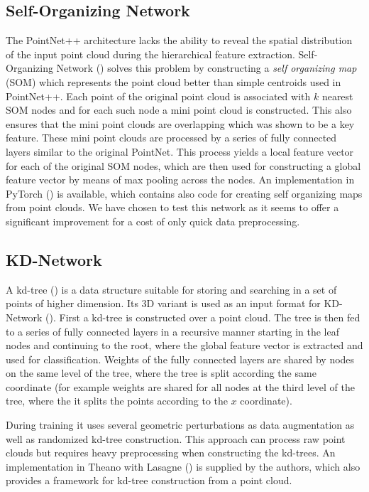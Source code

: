 \subsection{Self-Organizing Network}
The PointNet++ architecture lacks the ability to reveal the spatial distribution of the input point cloud during the hierarchical feature extraction. Self-Organizing Network (\cite{li_so-net:_2018}) solves this problem by constructing a \textit{self organizing map} (SOM) which represents the point cloud better than simple centroids used in PointNet++. Each point of the original point cloud is associated with $k$ nearest SOM nodes and for each such node a mini point cloud is constructed. This also ensures that the mini point clouds are overlapping which was shown to be a key feature. These mini point clouds are processed by a series of fully connected layers similar to the original PointNet. This process yields a local feature vector for each of the original SOM nodes, which are then used for constructing a global feature vector by means of max pooling across the nodes. An implementation in PyTorch (\cite{li_sonet_2018}) is available, which contains also code for creating self organizing maps from point clouds. We have chosen to test this network as it seems to offer a significant improvement for a cost of only quick data preprocessing.

\subsection{KD-Network}
A kd-tree (\cite{bentley_multidimensional_1975}) is a data structure suitable for storing and searching in a set of points of higher dimension. Its 3D variant is used as an input format for KD-Network (\cite{klokov_escape_2017}). First a kd-tree is constructed over a point cloud. The tree is then fed to a series of fully connected layers in a recursive manner starting in the leaf nodes and continuing to the root, where the global feature vector is extracted and used for classification. Weights of the fully connected layers are shared  by nodes on the same level of the tree, where the tree is split according the same coordinate (for example weights are shared for all nodes at the third level of the tree, where the it splits the points according to the $x$ coordinate). \par
During training it uses several geometric perturbations as data augmentation as well as randomized kd-tree construction. This approach can process raw point clouds but requires heavy preprocessing when constructing the kd-trees.
An implementation in Theano with Lasagne (\cite{klokov_kd-net_2017}) is supplied by the authors, which also provides a framework for kd-tree construction from a point cloud.

